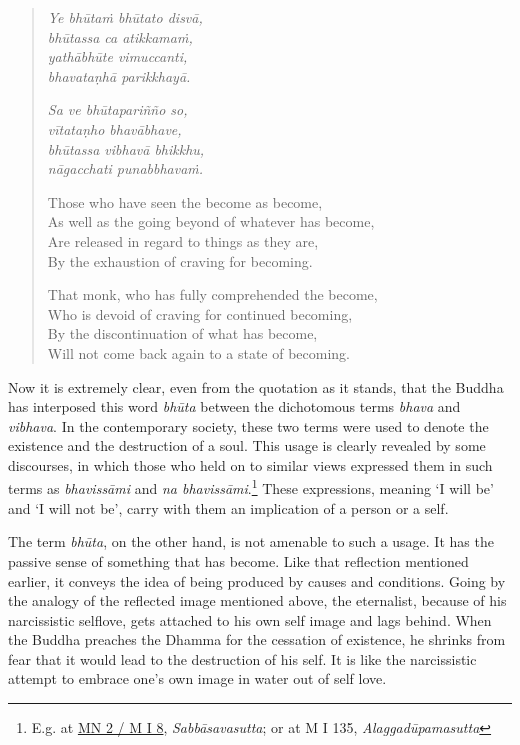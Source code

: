 \begin{quote}
\emph{Ye bhūtaṁ bhūtato disvā,}\\
\emph{bhūtassa ca atikkamaṁ,}\\
\emph{yathābhūte vimuccanti,}\\
\emph{bhavataṇhā parikkhayā.}

\emph{Sa ve bhūtapariñño so,}\\
\emph{vītataṇho bhavābhave,}\\
\emph{bhūtassa vibhavā bhikkhu,}\\
\emph{nāgacchati punabbhavaṁ.}

Those who have seen the become as become,\\
As well as the going beyond of whatever has become,\\
Are released in regard to things as they are,\\
By the exhaustion of craving for becoming.

\clearpage

That monk, who has fully comprehended the become,\\
Who is devoid of craving for continued becoming,\\
By the discontinuation of what has become,\\
Will not come back again to a state of becoming.
\end{quote}

Now it is extremely clear, even from the quotation as it stands, that the Buddha has interposed this word \emph{bhūta} between the dichotomous terms \emph{bhava} and \emph{vibhava}. In the contemporary society, these two terms were used to denote the existence and the destruction of a soul. This usage is clearly revealed by some discourses, in which those who held on to similar views expressed them in such terms as \emph{bhavissāmi} and \emph{na bhavissāmi}.\footnote{E.g. at \href{https://suttacentral.net/mn2/pli/ms}{MN 2 / M I 8}, \emph{Sabbāsavasutta}; or at M I 135, \emph{Alaggadūpamasutta}} These expressions, meaning `I will be' and `I will not be', carry with them an implication of a person or a self.

The term \emph{bhūta}, on the other hand, is not amenable to such a usage. It has the passive sense of something that has become. Like that reflection mentioned earlier, it conveys the idea of being produced by causes and conditions. Going by the analogy of the reflected image mentioned above, the eternalist, because of his narcissistic selflove, gets attached to his own self image and lags behind. When the Buddha preaches the Dhamma for the cessation of existence, he shrinks from fear that it would lead to the destruction of his self. It is like the narcissistic attempt to embrace one's own image in water out of self love.

